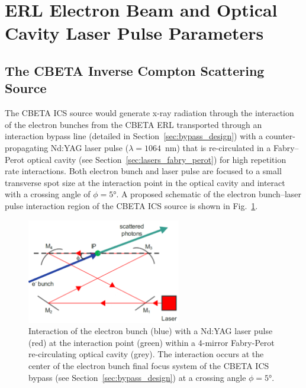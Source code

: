 \documentclass[../main.tex]{subfiles}
\begin{document}
\section{ERL Electron Beam and Optical Cavity Laser Pulse Parameters}
\label{sec:CBETA_electron_laser_parameters}

\subsection{The CBETA Inverse Compton Scattering Source}
\label{sec:CBETA_ICS_source_description}

The CBETA ICS source would generate x-ray radiation through the interaction of the electron bunches from the CBETA ERL transported through an interaction bypass line (detailed in Section~\ref{sec:bypass_design}) with a counter-propagating Nd:YAG laser pulse ($\lambda=1064$~\si{\nano\meter}) that is re-circulated in a Fabry--Perot optical cavity (see Section~\ref{sec:lasers_fabry_perot}) for high repetition rate interactions. Both electron bunch and laser pulse are focused to a small transverse spot size at the interaction point in the optical cavity and interact with a crossing angle of $\phi =5$\si{\degree}. A proposed schematic of the electron bunch--laser pulse interaction region of the CBETA ICS source is shown in Fig.~\ref{fig:CBETA_ICS_Interaction}. 
\begin{figure}[!h]
\centering
\includegraphics[width=0.6\textwidth]{Figures/CBETA_Inverse_Compton_Source_Design/CBETA_interaction_fixed.pdf}
\caption{Interaction of the electron bunch (blue) with a Nd:YAG laser pulse (red) at the interaction point (green) within a 4-mirror Fabry-Perot re-circulating optical cavity (grey). The interaction occurs at the center of the electron bunch final focus system of the CBETA ICS bypass (see Section~\ref{sec:bypass_design}) at a crossing angle $\phi=5$\si{\degree}.}
\label{fig:CBETA_ICS_Interaction}
\end{figure}
\end{document}
